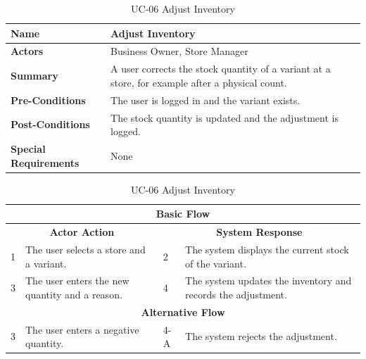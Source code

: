 \documentclass{StockSense}
\begin{document}
\begin{table}[!htbp]
\centering
\caption{UC-06 Adjust Inventory}
{\small\linespread{1}\selectfont
\begin{tabular}{|p{}|p{}|}
\hline
\textbf{Name} & Adjust Inventory \\ \hline
\textbf{Actors} & Business Owner, Store Manager \\ \hline
\textbf{Summary} & A user corrects the stock quantity of a variant at a store, for example after a physical count. \\ \hline
\textbf{Pre-Conditions} & The user is logged in and the variant exists. \\ \hline
\textbf{Post-Conditions} & The stock quantity is updated and the adjustment is logged. \\ \hline
\textbf{Special Requirements} & None \\ \hline
\end{tabular}\par\nointerlineskip
\begin{tabular}{|p{}|p{}|p{}|p{}|}
\multicolumn{4}{|c|}{\textbf{Basic Flow}} \\ \hline
\multicolumn{2}{|c|}{\textbf{Actor Action}} & \multicolumn{2}{c|}{\textbf{System Response}} \\ \hline
1 & The user selects a store and a variant. & 2 & The system displays the current stock of the variant. \\ \hline
3 & The user enters the new quantity and a reason. & 4 & The system updates the inventory and records the adjustment. \\ \hline
\multicolumn{4}{|c|}{\textbf{Alternative Flow}} \\ \hline
3 & The user enters a negative quantity. & 4-A & The system rejects the adjustment. \\ \hline
\end{tabular}\par}
\end{table}
\end{document}
